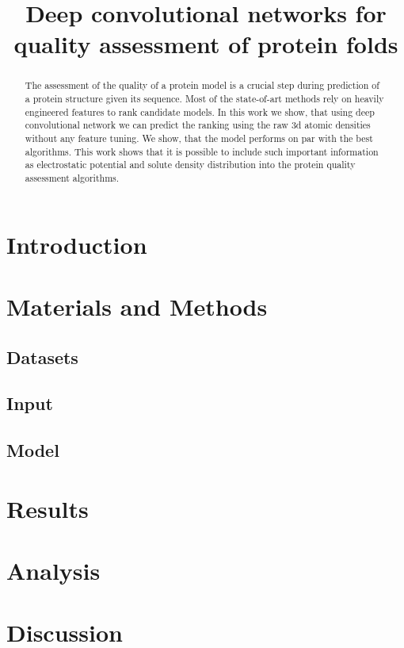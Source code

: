 \documentclass[letter,10pt]{article}
\title{Deep convolutional networks for quality assessment of protein folds}
\author{}
\begin{document}
\maketitle

\begin{abstract}
The assessment of the quality of a protein model is a crucial step during prediction of a protein structure given its sequence. 
Most of the state-of-art methods rely on heavily engineered features to rank candidate models. In this work we show, that 
using deep convolutional network we can predict the ranking using the raw 3d atomic densities without any feature tuning. 
We show, that the model performs on par with the best algorithms. This work shows that it is possible to include 
such important information as electrostatic potential and solute density distribution into the protein quality assessment algorithms.
\end{abstract}

\section{Introduction}


\section{Materials and Methods}

\subsection{Datasets}


\subsection{Input}


\subsection{Model}




\section{Results}


\section{Analysis}


\section{Discussion}


{}

\end{document}
